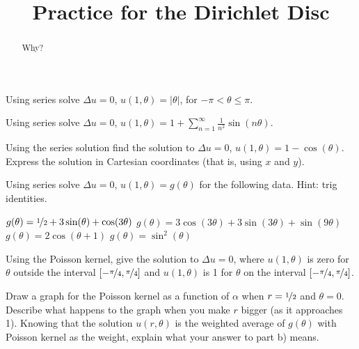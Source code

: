 \documentclass{ximera}
\title{Practice for the Dirichlet Disc}
\begin{document}
\begin{abstract}
Why?
\end{abstract}
\maketitle


\begin{exercise}
    Using series solve $\Delta u = 0$, $u(1,\theta) = \lvert \theta \rvert$, for $-\pi < \theta \leq \pi$.
\end{exercise}

\begin{exercise}%
    Using series solve $\Delta u = 0$, $u(1,\theta) = 1+ \sum\limits_{n=1}^\infty \frac{1}{n^2}\sin(n\theta)$.
\end{exercise}

\begin{exercise}%
    Using the series solution find the solution to $\Delta u = 0$, $u(1,\theta) = 1- \cos(\theta)$.  Express the solution in Cartesian coordinates (that is, using $x$ and $y$).
\end{exercise}

\begin{exercise}
    Using series solve $\Delta u = 0$, $u(1,\theta) = g(\theta)$ for the following data.  Hint: trig identities.
    \begin{tasks}
        \task $g(\theta) = \nicefrac{1}{2} + 3\sin(\theta) + \cos(3\theta)$
        \task $g(\theta) = 3\cos(3\theta) + 3\sin(3\theta) + \sin(9\theta)$
        \task $g(\theta) = 2 \cos(\theta+1)$
        \task $g(\theta) = \sin^2(\theta)$
    \end{tasks}
\end{exercise}

\begin{exercise}
    Using the Poisson kernel, give the solution to $\Delta u = 0$, where $u(1,\theta)$ is zero for $\theta$ outside the interval $[-\nicefrac{\pi}{4},\nicefrac{\pi}{4}]$ and  $u(1,\theta)$ is 1 for $\theta$ on the interval $[-\nicefrac{\pi}{4},\nicefrac{\pi}{4}]$.
\end{exercise}

\begin{exercise}
    \begin{tasks}
        \task Draw a graph for the Poisson kernel as a function of $\alpha$ when $r=\nicefrac{1}{2}$ and $\theta = 0$. 
        \task Describe what happens to the graph when you make $r$ bigger (as it approaches 1).
        \task Knowing that the solution $u(r,\theta)$ is the weighted average of $g(\theta)$ with Poisson kernel as the weight, explain what your answer to part b) means.
    \end{tasks}
\end{exercise}
\end{document}
